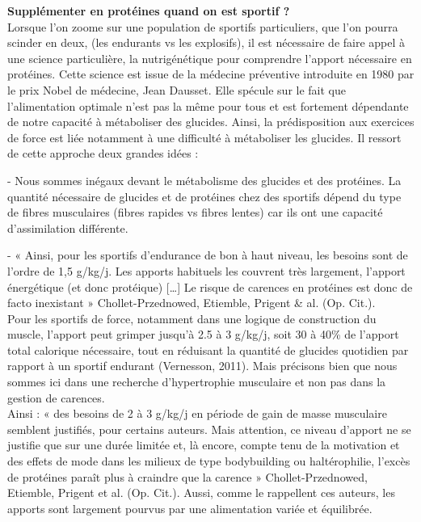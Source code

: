 \documentclass[8pt]{article}
\begin{document}
\textbf{Supplémenter en protéines quand on est sportif ?}\\


Lorsque l'on zoome sur une population de sportifs particuliers, que l'on pourra scinder en deux, (les endurants vs les explosifs), il est nécessaire de faire appel à une science particulière, la nutrigénétique pour comprendre l'apport nécessaire en protéines.  Cette science est issue de la médecine préventive introduite en 1980 par le prix Nobel de médecine, Jean Dausset. Elle spécule sur le fait que l'alimentation optimale n'est pas la même pour tous et est fortement dépendante de notre capacité à métaboliser des glucides. Ainsi, la prédisposition aux exercices de force est liée notamment à une difficulté à métaboliser les glucides. Il ressort de cette approche deux grandes idées :

	- Nous sommes inégaux devant le métabolisme des glucides et des protéines.
La quantité nécessaire de glucides et de protéines chez des sportifs dépend du type de fibres musculaires (fibres rapides vs fibres lentes) car ils ont une capacité d'assimilation différente.

	- « Ainsi, pour les sportifs d'endurance de bon à haut niveau, les besoins sont de l'ordre de 1,5 g/kg/j. Les apports habituels les couvrent très largement, l'apport énergétique (et donc protéique) […] Le risque de carences en protéines est donc de facto inexistant » Chollet-Przednowed, Etiemble, Prigent \& al. (Op. Cit.).\\

Pour les sportifs de force, notamment dans une logique de construction du muscle, l'apport peut grimper jusqu'à 2.5 à 3 g/kg/j, soit 30 à 40\% de l’apport total calorique nécessaire, tout en réduisant la quantité de glucides quotidien par rapport à un sportif endurant (Vernesson, 2011). Mais précisons bien que nous sommes ici dans une recherche d'hypertrophie musculaire et non pas dans la gestion de carences.\\

Ainsi : « des besoins de 2 à 3 g/kg/j en période de gain de masse musculaire semblent justifiés, pour certains auteurs. Mais attention, ce niveau d'apport ne se justifie que sur une durée limitée et, là encore, compte tenu de la motivation et des effets de mode dans les milieux de type bodybuilding ou haltérophilie, l'excès de protéines paraît plus à craindre que la carence » Chollet-Przednowed, Etiemble, Prigent et al. (Op. Cit.). Aussi, comme le rappellent ces auteurs, les apports sont largement pourvus par une alimentation variée et équilibrée.\\
\end{document}
